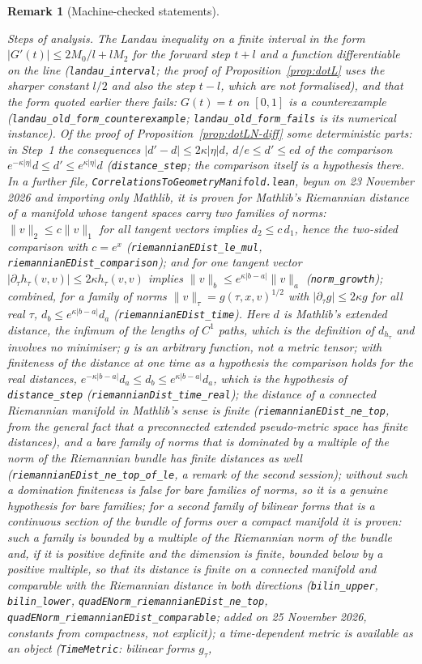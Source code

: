\documentclass[11pt,a4paper]{article}
\theoremstyle{stmt}
\theoremstyle{defn}
\theoremstyle{rmk}
\newtheorem{remark}[theorem]{Remark}
\numberwithin{equation}{section}
\begin{document}
{\begin{remark}[Machine-checked statements]
\begin{itemize}
\emph{Steps of analysis.} The Landau inequality on a finite interval in the form $|G'(t)|\le2M_0/l+lM_2$ for the forward step $t+l$ and a function differentiable on the line (\texttt{landau\_interval}; the proof of Proposition~\ref{prop:dotL} uses the sharper constant $l/2$ and also the step $t-l$, which are not formalised), and that the form quoted earlier there fails: $G(t)=t$ on $[0,1]$ is a counterexample (\texttt{landau\_old\_form\_counterexample}; \texttt{landau\_old\_form\_fails} is its numerical instance). Of the proof of Proposition~\ref{prop:dotLN-diff} some deterministic parts: in Step~1 the consequences $|d'-d|\le2\kappa|\eta|d$, $d/e\le d'\le ed$ of the comparison $e^{-\kappa|\eta|}d\le d'\le e^{\kappa|\eta|}d$ (\texttt{distance\_step}; the comparison itself is a hypothesis there. In a further file, \texttt{CorrelationsToGeometryManifold.lean}, begun on 23 November 2026 and importing only Mathlib, it is proven for Mathlib's Riemannian distance of a manifold whose tangent spaces carry two families of norms: $\|v\|_2\le c\|v\|_1$ for all tangent vectors implies $d_2\le c\,d_1$, hence the two-sided comparison with $c=e^{x}$ (\texttt{riemannianEDist\_le\_mul}, \texttt{riemannianEDist\_comparison}); and for one tangent vector $|\partial_\tau h_\tau(v,v)|\le2\kappa h_\tau(v,v)$ implies $\|v\|_b\le e^{\kappa|b-a|}\|v\|_a$ (\texttt{norm\_growth}); combined, for a family of norms $\|v\|_\tau=g(\tau,x,v)^{1/2}$ with $|\partial_\tau g|\le2\kappa g$ for all real $\tau$, $d_b\le e^{\kappa|b-a|}d_a$ (\texttt{riemannianEDist\_time}). Here $d$ is Mathlib's extended distance, the infimum of the lengths of $C^1$ paths, which is the definition of $d_{h_\tau}$ and involves no minimiser; $g$ is an arbitrary function, not a metric tensor; with finiteness of the distance at one time as a hypothesis the comparison holds for the real distances, $e^{-\kappa|b-a|}d_a\le d_b\le e^{\kappa|b-a|}d_a$, which is the hypothesis of \texttt{distance\_step} (\texttt{riemannianDist\_time\_real}); the distance of a connected Riemannian manifold in Mathlib's sense is finite (\texttt{riemannianEDist\_ne\_top}, from the general fact that a preconnected extended pseudo-metric space has finite distances), and a bare family of norms that is dominated by a multiple of the norm of the Riemannian bundle has finite distances as well (\texttt{riemannianEDist\_ne\_top\_of\_le}, a remark of the second session); without such a domination finiteness is false for bare families of norms, so it is a genuine hypothesis for bare families; for a second family of bilinear forms that is a continuous section of the bundle of forms over a \emph{compact} manifold it is proven: such a family is bounded by a multiple of the Riemannian norm of the bundle and, if it is positive definite and the dimension is finite, bounded below by a positive multiple, so that its distance is finite on a connected manifold and comparable with the Riemannian distance in both directions (\texttt{bilin\_upper}, \texttt{bilin\_lower}, \texttt{quadENorm\_riemannianEDist\_ne\_top}, \texttt{quadENorm\_riemannianEDist\_comparable}; added on 25 November 2026, constants from compactness, not explicit); a time-dependent metric is available as an object (\texttt{TimeMetric}: bilinear forms $g_\tau$, 
\end{itemize}
\end{remark}}
\end{document}
